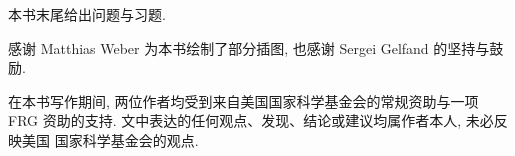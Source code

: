 本书末尾给出问题与习题.

感谢 Matthias Weber 为本书绘制了部分插图, 也感谢 Sergei Gelfand 的坚持与鼓励.

在本书写作期间, 两位作者均受到来自美国国家科学基金会的常规资助与一项 FRG
资助的支持. 文中表达的任何观点、发现、结论或建议均属作者本人, 未必反映美国
国家科学基金会的观点.

\cleardoublepage
